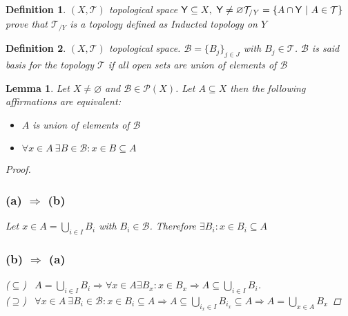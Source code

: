 \documentclass{article}
\newtheorem{definition}{Definition}
\newtheorem{lemma}{Lemma}
\begin{document}
    \begin{definition}
        $(X, \mathcal{T})$ topological space $\mathsf{Y} \subseteq X, \ \mathsf{Y} \neq \varnothing \\ \mathcal{T}_{/Y} = \{ A\cap \mathsf{Y} \ | \ A \in \mathcal{T} \}$ prove that $\mathcal{T}_{/Y}$ is a topology defined as Inducted topology on $Y$
    \end{definition}
    \begin{definition}
        $(X,\mathcal{T})$ topological space. $\mathcal{B} = \{ B_j\}_{j\in J}$ with $B_j \in \mathcal{T}$. $\mathcal{B}$ is said basis for the topology $\mathcal{T}$ if all open sets are union of elements of $\mathcal{B}$  
    \end{definition}
    \begin{lemma}
        Let $X \neq \varnothing$ and $\mathcal{B} \in \mathcal{P}(X)$. Let $A \subseteq X$ then the following affirmations are equivalent:
        \begin{itemize}
            \item[(a)] $A$ is union of elements of $\mathcal{B}$
            \item[(b)] $\forall x \in A \ \exists B \in \mathcal{B} : x\in B \subseteq A$ 
        \end{itemize}
        \begin{proof}
            \subsubsection*{(a) $\Rightarrow$ (b)}
                Let $x \in A = \bigcup_{i \in I}B_i$ with $B_i \in \mathcal{B}$. Therefore $\exists B_i: x\in B_i \subseteq A$ 
            \subsubsection*{(b) $\Rightarrow$ (a)}
                ($\subseteq$) \ $A = \bigcup_{i\in I} B_i \Rightarrow \forall x \in A \exists B_x : x\in B_x \Rightarrow A \subseteq \bigcup_{i\in I} B_i$. \\
                ($\supseteq$) \ $\forall x \in A \ \exists B_i \in \mathcal{B} : x\in B_i \subseteq A \Rightarrow A \subseteq \bigcup_{i_x\in I}B_{i_{x}}\subseteq A \Rightarrow A = \bigcup_{x\in A}B_x$
        \end{proof}
    \end{lemma}
\end{document}
